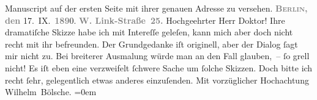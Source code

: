 \begin{ledgroupsized}[t]{13cm}
{{                            Manuscript auf der ersten Seite mit ihrer genauen Adresse zu
                            versehen.}}\pend
           \pstart
           \raggedleft{}\textcolor{gray}{\textbf{\textsc{Berlin}, den}}{ }17. IX. \textcolor{gray}{\textbf{189}}0.\pend
           \pstart
           \noindent{}\raggedleft{}\textcolor{gray}{\textbf{W. Link-Straße 25.}}\pend
           \pstart\center{}Hochgeehrter Herr Doktor!\pend\pstart
           Ihre dramatiſche Skizze habe
                    ich mit Intereſſe geleſen, kann mich aber doch nicht recht mit ihr befreunden.
                    Der Grundgedanke iſt originell, aber der Dialog ſagt mir nicht zu. Bei breiterer
                    Ausmalung würde man an den Fall glauben, – ſo grell nicht! Es iſt eben eine
                    verzweifelt ſchwere Sache um ſolche Skizzen. Doch bitte ich recht ſehr,
                    gelegentlich etwas anderes einzuſenden.\pend
           \pstart
           Mit vorzüglicher Hochachtung{\\[\baselineskip]}\spacefill\mbox{Wilhelm Bölsche.}\pend
           \leftskip=0em{}\endnumbering{}\end{ledgroupsized}  \newcommand{\dateiname}{L00004}\newcommand{\titel}{Wilhelm Bölsche an Arthur Schnitzler, 17. 9. 1890}\newcommand{\editorInnen}{Martin Anton Müller und Gerd-Hermann Susen}
      
